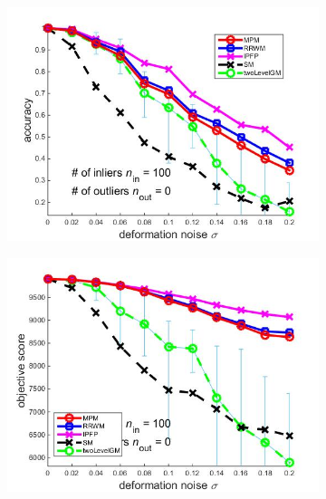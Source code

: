 \documentclass[
	fontsize=12pt,
	paper=a4,
	twoside=false,
	numbers=noenddot,
	plainheadsepline,
	toc=listof,
	toc=bibliography
]{scrartcl}
\begin{document}
\begin{figure}[h] 
	\begin{subfigure}[b]{0.3\textwidth}
		\centering
		\includegraphics[scale=0.25]{"fig_ver2608/syntheticPointSets/ver4.3/deformation/accuracy_avg10t"} 
				\caption{} 
	\end{subfigure}%
	\begin{subfigure}[b]{0.3\textwidth}
		\centering
		\includegraphics[scale=0.25]{"fig_ver2608/syntheticPointSets/ver4.3/deformation/score_avg10t"} 
				\caption{} 
	\end{subfigure} 
	\begin{subfigure}[b]{0.3\textwidth}
		\centering

\end{subfigure}
\end{figure}
\end{document}
